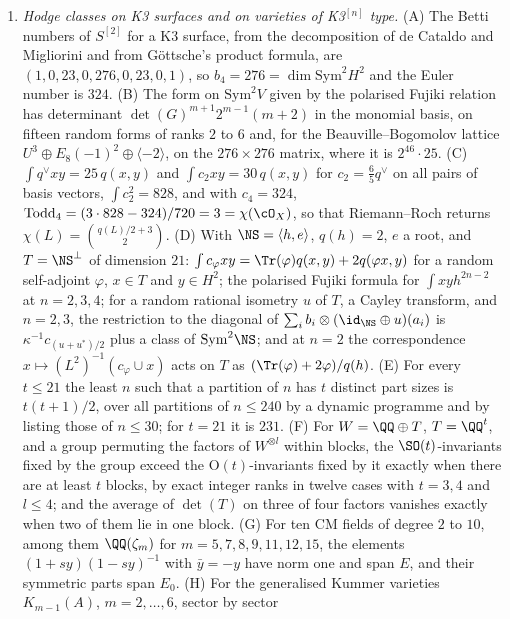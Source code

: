 \begin{enumerate}[label=\textup{(\Roman*)},leftmargin=*]
\item \emph{Hodge classes on K3 surfaces and on varieties of K3$^{[n]}$
  type.} (A) The Betti numbers of $S^{[2]}$ for a K3 surface, from the
  decomposition of de Cataldo and Migliorini and from G\"ottsche's product
  formula, are $(1,0,23,0,276,0,23,0,1)$, so $b_{4}=276=\dim
  \mathrm{Sym}^{2}H^{2}$ and the Euler number is $324$. (B) The form on
  $\mathrm{Sym}^{2}V$ given by the polarised Fujiki relation has
  determinant $\det(G)^{m+1}2^{m-1}(m+2)$ in the monomial basis, on fifteen
  random forms of ranks $2$ to $6$ and, for the Beauville--Bogomolov lattice
  $U^{3}\oplus E_{8}(-1)^{2}\oplus\langle-2\rangle$, on the $276\times276$
  matrix, where it is $2^{46}\cdot25$. (C) $\int q^{\vee}xy=25\,q(x,y)$ and
  $\int c_{2}xy=30\,q(x,y)$ for $c_{2}=\frac65q^{\vee}$ on all pairs of
  basis vectors, $\int c_{2}^{2}=828$, and with $c_{4}=324$,
  $\operatorname{Todd}_{4}=(3\cdot828-324)/720=3=\chi(\cO_{X})$, so that
  Riemann--Roch returns $\chi(L)=\binom{q(L)/2+3}{2}$. (D) With
  $\NS=\langle h,e\rangle$, $q(h)=2$, $e$ a root, and $T=\NS^{\perp}$ of
  dimension $21$: $\int c_{\varphi}xy=\Tr(\varphi)q(x,y)+2q(\varphi x,y)$
  for a random self-adjoint $\varphi$, $x\in T$ and $y\in H^{2}$; the
  polarised Fujiki formula for $\int xyh^{2n-2}$ at $n=2,3,4$; for a random
  rational isometry $u$ of $T$, a Cayley transform, and $n=2,3$, the
  restriction to the diagonal of $\sum_{i}b_{i}\otimes(\id_{\NS}\oplus
  u)(a_{i})$ is $\kappa^{-1}c_{(u+u^{*})/2}$ plus a class of
  $\mathrm{Sym}^{2}\NS$; and at $n=2$ the correspondence
  $x\mapsto(L^{2})^{-1}(c_{\varphi}\cup x)$ acts on $T$ as
  $(\Tr(\varphi)+2\varphi)/q(h)$. (E) For every $t\le21$ the least $n$ such
  that a partition of $n$ has $t$ distinct part sizes is $t(t+1)/2$, over all
  partitions of $n\le240$ by a dynamic programme and by listing those of
  $n\le30$; for $t=21$ it is $231$. (F) For $W=\QQ\oplus T$, $T=\QQ^{t}$, and
  a group permuting the factors of $W^{\otimes l}$ within blocks, the
  $\SO(t)$-invariants fixed by the group exceed the $\mathrm{O}(t)$-invariants
  fixed by it exactly when there are at least $t$ blocks, by exact integer
  ranks in twelve cases with $t=3,4$ and $l\le4$; and the average of
  $\det(T)$ on three of four
  factors vanishes exactly when two of them lie in one block. (G) For ten CM
  fields of degree $2$ to $10$, among them $\QQ(\zeta_{m})$ for
  $m=5,7,8,9,11,12,15$, the elements $(1+sy)(1-sy)^{-1}$ with $\bar y=-y$ have
  norm one and span $E$, and their symmetric parts span $E_{0}$. (H) For the
  generalised Kummer varieties $K_{m-1}(A)$, $m=2,\dots,6$, sector by sector

\end{enumerate}
